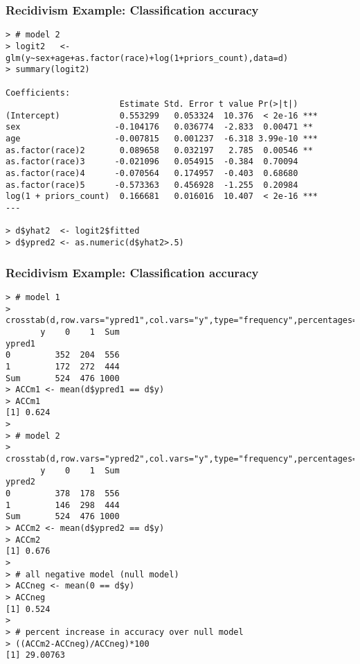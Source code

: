 \documentclass[xcolor=dvipsnames]{beamer}
\begin{document}
\begin{frame}[fragile]
\frametitle{Recidivism Example: Classification accuracy}

\begin{Verbatim}[fontsize=\tiny, frame=single, label=R Code]
> # model 2
> logit2   <- glm(y~sex+age+as.factor(race)+log(1+priors_count),data=d)
> summary(logit2)

Coefficients:
                       Estimate Std. Error t value Pr(>|t|)    
(Intercept)            0.553299   0.053324  10.376  < 2e-16 ***
sex                   -0.104176   0.036774  -2.833  0.00471 ** 
age                   -0.007815   0.001237  -6.318 3.99e-10 ***
as.factor(race)2       0.089658   0.032197   2.785  0.00546 ** 
as.factor(race)3      -0.021096   0.054915  -0.384  0.70094    
as.factor(race)4      -0.070564   0.174957  -0.403  0.68680    
as.factor(race)5      -0.573363   0.456928  -1.255  0.20984    
log(1 + priors_count)  0.166681   0.016016  10.407  < 2e-16 ***
---

> d$yhat2  <- logit2$fitted
> d$ypred2 <- as.numeric(d$yhat2>.5)
\end{Verbatim}
\end{frame}

\begin{frame}[fragile]
\frametitle{Recidivism Example: Classification accuracy}

\begin{Verbatim}[fontsize=\tiny, frame=single, label=R Code]
> # model 1
> crosstab(d,row.vars="ypred1",col.vars="y",type="frequency",percentages=F)
       y    0    1  Sum
ypred1                 
0         352  204  556
1         172  272  444
Sum       524  476 1000
> ACCm1 <- mean(d$ypred1 == d$y)
> ACCm1
[1] 0.624
> 
> # model 2
> crosstab(d,row.vars="ypred2",col.vars="y",type="frequency",percentages=F)
       y    0    1  Sum
ypred2                 
0         378  178  556
1         146  298  444
Sum       524  476 1000
> ACCm2 <- mean(d$ypred2 == d$y)
> ACCm2
[1] 0.676
> 
> # all negative model (null model)
> ACCneg <- mean(0 == d$y)
> ACCneg
[1] 0.524
> 
> # percent increase in accuracy over null model
> ((ACCm2-ACCneg)/ACCneg)*100
[1] 29.00763

\end{Verbatim}
\end{frame}
\end{document}
